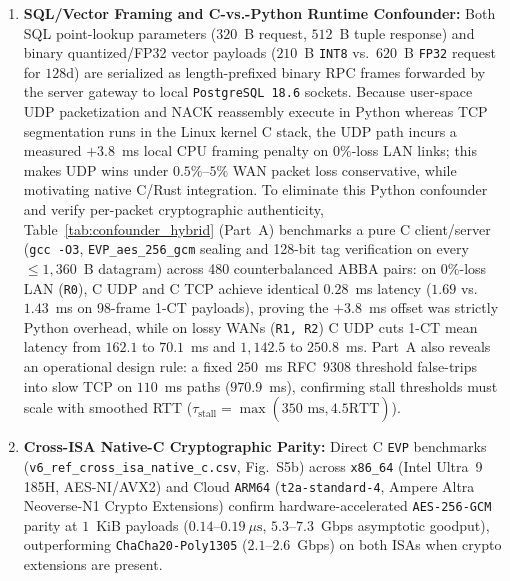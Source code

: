 \documentclass[10pt,journal,compsoc]{IEEEtran}
\begin{document}
\begin{enumerate}
    \item \textbf{SQL/Vector Framing and C-vs.-Python Runtime Confounder:} Both SQL point-lookup parameters ($320$~B request, $512$~B tuple response) and binary quantized/FP32 vector payloads ($210$~B \texttt{INT8} vs.\ $620$~B \texttt{FP32} request for $128$d) are serialized as length-prefixed binary RPC frames forwarded by the server gateway to local \texttt{PostgreSQL~18.6} sockets. Because user-space UDP packetization and NACK reassembly execute in Python whereas TCP segmentation runs in the Linux kernel C stack, the UDP path incurs a measured $+3.8$~ms local CPU framing penalty on $0\%$-loss LAN links; this makes UDP wins under $0.5\%\text{--}5\%$ WAN packet loss conservative, while motivating native C/Rust integration. To eliminate this Python confounder and verify per-packet cryptographic authenticity, Table~\ref{tab:confounder_hybrid} (Part~A) benchmarks a pure C client/server (\texttt{gcc -O3}, \nolinkurl{EVP_aes_256_gcm} sealing and 128-bit tag verification on every $\le 1{,}360$~B datagram) across 480 counterbalanced ABBA pairs: on $0\%$-loss LAN (\texttt{R0}), C UDP and C TCP achieve identical $0.28$~ms latency ($1.69$ vs.\ $1.43$~ms on 98-frame 1-CT payloads), proving the $+3.8$~ms offset was strictly Python overhead, while on lossy WANs (\texttt{R1, R2}) C UDP cuts 1-CT mean latency from $162.1$ to $70.1$~ms and $1{,}142.5$ to $250.8$~ms. Part~A also reveals an operational design rule: a fixed $250$~ms RFC~9308 threshold false-trips into slow TCP on $110$~ms paths ($970.9$~ms), confirming stall thresholds must scale with smoothed RTT ($\tau_{\text{stall}} = \max(350\text{~ms},\allowbreak 4.5\widehat{\mathrm{RTT}})$).
    \item \textbf{Cross-ISA Native-C Cryptographic Parity:} Direct C \texttt{EVP} benchmarks (\nolinkurl{v6_ref_cross_isa_native_c.csv}, Fig.~S5b) across \nolinkurl{x86_64} (Intel Ultra~9 185H, AES-NI/AVX2) and Cloud \texttt{ARM64} (\nolinkurl{t2a-standard-4}, Ampere Altra Neoverse-N1 Crypto Extensions) confirm hardware-accelerated \texttt{AES-256-GCM} parity at $1$~KiB payloads ($0.14\text{--}0.19~\mu\text{s}$, $5.3\text{--}7.3$~Gbps asymptotic goodput), outperforming \nolinkurl{ChaCha20-Poly1305} ($2.1\text{--}2.6$~Gbps) on both ISAs when crypto extensions are present.
\end{enumerate}
\end{document}
